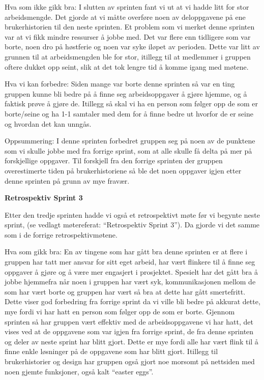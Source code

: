 \documentclass[12pt,a4paper,norsk]{article}
\begin{document}
Hva som ikke gikk bra:
I slutten av sprinten fant vi ut at vi hadde litt for stor arbeidsmengde. Det gjorde at vi måtte overføre noen av deloppgavene på ene brukerhistorien til den neste sprinten. 
Et problem som vi merket denne sprinten var at vi fikk mindre ressurser å jobbe med. Det var flere enn tidligere som var borte, noen dro på høstferie og noen var syke iløpet av perioden. Dette var litt av grunnen til at arbeidsmengden ble for stor, itillegg til at medlemmer i gruppen oftere dukket opp seint, slik at det tok lengre tid å komme igang med møtene. 

Hva vi kan forbedre:
Siden mange var borte denne sprinten så var en ting gruppen kunne bli bedre på å finne seg arbeidsoppgaver å gjøre hjemme, og å faktisk prøve å gjøre de.
Itillegg så skal vi ha en person som følger opp de som er borte/seine og ha 1-1 samtaler med dem for å finne bedre ut hvorfor de er seine og hvordan det kan unngås. 

Oppsummering:
I denne sprinten forbedret gruppen seg på noen av de punktene som vi skulle jobbe med fra forrige sprint, som at alle skulle få delta på mer på forskjellige oppgaver. Til forskjell fra den forrige sprinten der gruppen overestimerte tiden på brukerhistoriene så ble det noen oppgaver igjen etter denne sprinten på grunn av mye fravær. 

\bigskip \noindent \textbf{Retrospektiv Sprint 3}
\par Etter den tredje sprinten hadde vi også et retrospektivt møte før vi begynte neste sprint, (se vedlagt møtereferat: “Retrospektiv Sprint 3”). Da gjorde vi det samme som i de forrige retrospektivmøtene. 

Hva som gikk bra:
En av tingene som har gått bra denne sprinten er at flere i gruppen har tatt mer ansvar for sitt eget arbeid, har vært flinkere til å finne seg oppgaver å gjøre og å være mer engasjert i prosjektet. Spesielt har det gått bra å jobbe hjemmefra når noen i gruppen har vært syk, kommunikasjonen mellom de som har vært borte og gruppen har vært så bra at dette har gått smertefritt. Dette viser god forbedring fra forrige sprint da vi ville bli bedre på akkurat dette, mye fordi vi har hatt en person som følger opp de som er borte. 
Gjennom sprinten så har gruppen vært effektiv med de arbeidsoppgavene vi har hatt, det vises ved at de oppgavene som var igjen fra forrige sprint, de fra denne sprinten og deler av neste sprint har blitt gjort. Dette er mye fordi alle har vært flink til å finne enkle løsninger på de oppgavene som har blitt gjort. 
Itillegg til brukerhistorier og design har gruppen også gjort noe morsomt på nettsiden med noen gjemte funksjoner, også kalt “easter eggs”.  
\end{document}
